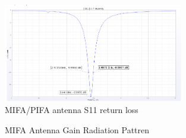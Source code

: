 \begin{figure}[h]
	\centering
	\includegraphics[width=0.7\textwidth]{Chap03/Figures/MIFA_Antenna_S11.PNG}
	\caption{MIFA/PIFA antenna S11 return loss}
	\label{fig:MIFA_S11}
\end{figure}
\begin{figure}[h]
	\centering
	\qquad
	\caption{MIFA Antenna Gain Radiation Pattren}
	\label{fig:MIFA_Antenna_Gain_Radiation_Pattren}
\end{figure}
